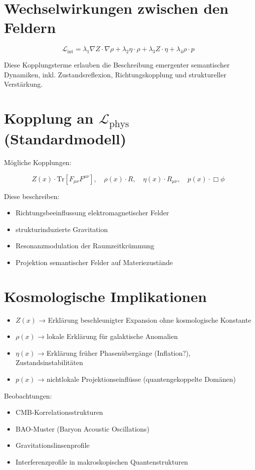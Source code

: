 \documentclass[11pt]{article}
\begin{document}
\section*{Wechselwirkungen zwischen den Feldern}

\[
\mathcal{L}_{\text{int}} =
\lambda_1 \nabla Z \cdot \nabla \rho +
\lambda_2 \eta \cdot \rho +
\lambda_3 Z \cdot \eta +
\lambda_4 \rho \cdot p
\]

Diese Kopplungsterme erlauben die Beschreibung emergenter semantischer Dynamiken, inkl. Zustandsreflexion, Richtungskopplung und struktureller Verstärkung.

\section*{Kopplung an $\mathcal{L}_{\text{phys}}$ (Standardmodell)}

Mögliche Kopplungen:

\[
Z(x) \cdot \mathrm{Tr}[F_{\mu\nu}F^{\mu\nu}],\quad
\rho(x) \cdot R,\quad
\eta(x) \cdot R_{\mu\nu},\quad
p(x) \cdot \Box \phi
\]

Diese beschreiben:
\begin{itemize}
  \item Richtungsbeeinflussung elektromagnetischer Felder
  \item strukturinduzierte Gravitation
  \item Resonanzmodulation der Raumzeitkrümmung
  \item Projektion semantischer Felder auf Materiezustände
\end{itemize}

\section*{Kosmologische Implikationen}

\begin{itemize}
  \item $Z(x)$ → Erklärung beschleunigter Expansion ohne kosmologische Konstante
  \item $\rho(x)$ → lokale Erklärung für galaktische Anomalien
  \item $\eta(x)$ → Erklärung früher Phasenübergänge (Inflation?), Zustandsinstabilitäten
  \item $p(x)$ → nichtlokale Projektionseinflüsse (quantengekoppelte Domänen)
\end{itemize}

Beobachtungen:
\begin{itemize}
  \item CMB-Korrelationsstrukturen
  \item BAO-Muster (Baryon Acoustic Oscillations)
  \item Gravitationslinsenprofile
  \item Interferenzprofile in makroskopischen Quantenstrukturen
\end{itemize}
\end{document}
